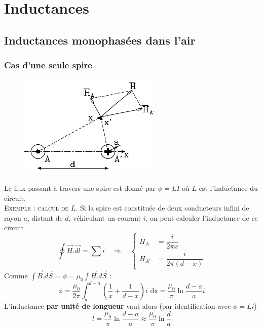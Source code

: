 \newpage
\section{Inductances}
	\subsection{Inductances monophasées dans l'air}
		\subsubsection{Cas d'une seule spire}
				\begin{figure}
		\vspace{-5mm}
		\includegraphics[scale=0.4]{ch3/image2.png}
		\end{figure}
		Le flux passant à travers une spire est donné par $\phi = 
		LI$ où 		$L$ est l'inductance du circuit.\\
		\textsc{Exemple : calcul de $L$}. Si la spire est constituée 
		de deux conducteurs infini de rayon $a$, distant de $d$, 
		véhiculant un courant $i$, on peut calculer l'inductance de 
		ce circuit
		\begin{equation}
		\oint \vec{H}.\vec{dl} = \sum i\quad\Rightarrow\quad \left\{
		\begin{array}{ll}
		H_A &= \dfrac{i}{2\pi x}\\
		H_{A'} &= \dfrac{i}{2\pi(d-x)}		
		\end{array}\right.
		\end{equation}
		Comme $\int\vec{B}.d\vec{S} = \phi = \mu_0\int\vec{H}.d\vec{S}$ :
		\begin{equation}
		\phi = \frac{\mu_0}{2\pi}\int_{a}^{d-a}\left(\frac{1}{x}+
		\frac{1}{d-x}\right) i \text{ dx} = \frac{\mu_0}{\pi}\ln
		\frac{d-a}{a}i
		\end{equation}
		L'inductance \textbf{par unité de longueur} vaut alors (par 
		identification 	avec $\phi = Li$)
		\begin{equation}
		l = \frac{\mu_0}{\pi}\ln\frac{d-a}{a}\approx\frac{\mu_0}{
		\pi}\ln\frac{d
		}{a}
		\end{equation}
		
